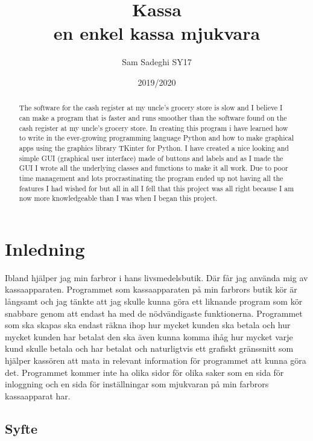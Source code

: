 \documentclass[a4paper, 12pt]{article}
\title{Kassa\\\large en enkel kassa mjukvara}
\author{Sam Sadeghi SY17}
\date{2019/2020}
\begin{document}
\begin{titlepage}
\maketitle
\end{titlepage}


\begin{abstract}
The software for the cash register at my uncle's grocery store is slow and I believe I can make a program that is faster and runs smoother than the software found on the cash register at my uncle's grocery store.
 In creating this program i have learned how to write in the ever-growing programming language Python and how to make graphical apps using the graphics library TKinter for Python.
I have created a nice looking and simple GUI (graphical user interface) made of buttons and labels and as I made the GUI I wrote all the underlying classes and functions to make it all work.
Due to poor time management and lots procrastinating the program ended up not having all the features I had wished for but all in all I fell that this project was all right because I am now more knowledgeable than I was when I began this project.
\end{abstract}
\newpage
\tableofcontents
\newpage

\section{Inledning}
Ibland hjälper jag min farbror i hans livsmedelsbutik. 
Där får jag  använda mig av kassaapparaten. 
Programmet som kassaapparaten på min farbrors butik kör är långsamt och jag tänkte att jag skulle kunna göra ett liknande program som kör snabbare genom att endast ha med de nödvändigaste funktionerna.
 Programmet som ska skapas ska endast räkna ihop hur mycket kunden ska betala och hur mycket kunden har betalat den ska även kunna komma ihåg hur mycket varje kund skulle betala och har betalat och naturligtvis ett grafiskt gränssnitt som hjälper kassören att mata in relevant information för programmet att kunna göra det.
Programmet kommer inte ha olika sidor för olika saker som en sida för inloggning och en sida för inställningar som mjukvaran på min farbrors kassaapparat har.


\subsection{Syfte}
\end{document}
